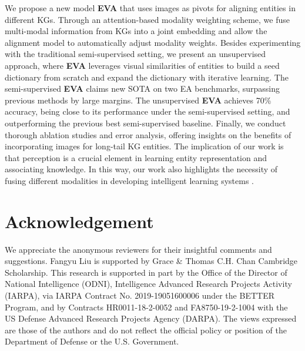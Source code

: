 \documentclass[letterpaper]{article} \usepackage{aaai21}  \usepackage{times}  \usepackage{helvet} \usepackage{courier}  \usepackage[hyphens]{url}  \usepackage{graphicx} \urlstyle{rm} \def\UrlFont{\rm}  \usepackage{natbib}  \usepackage{caption} \frenchspacing  \setlength{\pdfpagewidth}{8.5in}  \setlength{\pdfpageheight}{11in}
\newcommand{\modelname}[0]{\textbf{\textsc{EVA}}\xspace}
\begin{document}
We propose a new model \modelname that uses images as pivots for aligning entities in different KGs. Through an attention-based modality weighting scheme, we fuse multi-modal information from KGs into a joint embedding and allow the alignment model to automatically adjust modality weights. Besides experimenting with the traditional semi-supervised setting, we present an unsupervised approach, where \modelname leverages visual similarities of entities to build a seed dictionary from scratch and expand the dictionary with iterative learning. The semi-supervised \modelname claims new SOTA on two EA benchmarks, surpassing previous methods by large margins. The unsupervised \modelname achieves 70\% accuracy, being close to its performance under the semi-supervised setting, and outperforming the previous best semi-supervised baseline. Finally, we conduct thorough ablation studies and error analysis, offering insights on the benefits of incorporating images for long-tail KG entities. The implication of our work is that perception is a crucial element in learning entity representation and associating knowledge. In this way, our work also highlights the necessity of fusing different modalities in developing intelligent learning systems \citep{mooney2008learning}. 

%
 \section*{Acknowledgement}
We appreciate the anonymous reviewers for their insightful comments and suggestions.
Fangyu Liu is supported by Grace \& Thomas C.H. Chan Cambridge Scholarship. 
This research is supported in part by the Office of the Director of National Intelligence (ODNI), Intelligence Advanced Research Projects Activity (IARPA), via IARPA Contract No. 2019-19051600006 under the BETTER Program, and by Contracts HR0011-18-2-0052 and FA8750-19-2-1004 with the US Defense Advanced Research Projects Agency (DARPA). The views expressed are those of the authors and do not reflect the official policy or position of the Department of Defense or the U.S. Government. 
\newpage

\fontsize{9.0pt}{10.0pt}\selectfont







\clearpage
\appendix
\end{document}
